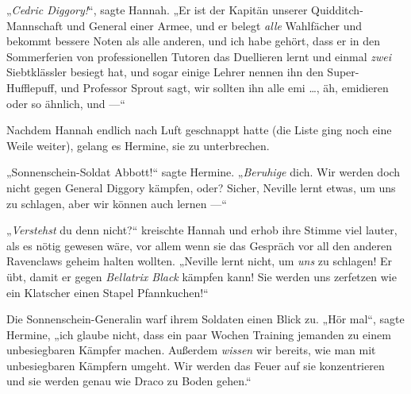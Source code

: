 „\emph{Cedric Diggory!}“, sagte Hannah.
„Er ist der Kapitän unserer Quidditch-Mannschaft und General einer Armee, und er belegt \emph{alle} Wahlfächer und bekommt bessere Noten als alle anderen, und ich habe gehört, dass er in den Sommerferien von professionellen Tutoren das Duellieren lernt und einmal \emph{zwei} Siebtklässler besiegt hat, und sogar einige Lehrer nennen ihn den Super-Hufflepuff, und Professor Sprout sagt, wir sollten ihn alle emi …, äh, emidieren oder so ähnlich, und —“

Nachdem Hannah endlich nach Luft geschnappt hatte (die Liste ging noch eine Weile weiter), gelang es Hermine, sie zu unterbrechen.

„Sonnenschein-Soldat Abbott!“ sagte Hermine.
„\emph{Beruhige} dich. Wir werden doch nicht gegen General Diggory kämpfen, oder? Sicher, Neville lernt etwas, um uns zu schlagen, aber wir können auch lernen —“

„\emph{Verstehst} du denn nicht?“ kreischte Hannah und erhob ihre Stimme viel lauter, als es nötig gewesen wäre, vor allem wenn sie das Gespräch vor all den anderen Ravenclaws geheim halten wollten.
„Neville lernt nicht, um \emph{uns} zu schlagen! Er übt, damit er gegen \emph{Bellatrix Black} kämpfen kann! Sie werden uns zerfetzen wie ein Klatscher einen Stapel Pfannkuchen!“

Die Sonnenschein-Generalin warf ihrem Soldaten einen Blick zu.
„Hör mal“, sagte Hermine, „ich glaube nicht, dass ein paar Wochen Training jemanden zu einem unbesiegbaren Kämpfer machen. Außerdem \emph{wissen} wir bereits, wie man mit unbesiegbaren Kämpfern umgeht. Wir werden das Feuer auf sie konzentrieren und sie werden genau wie Draco zu Boden gehen.“

